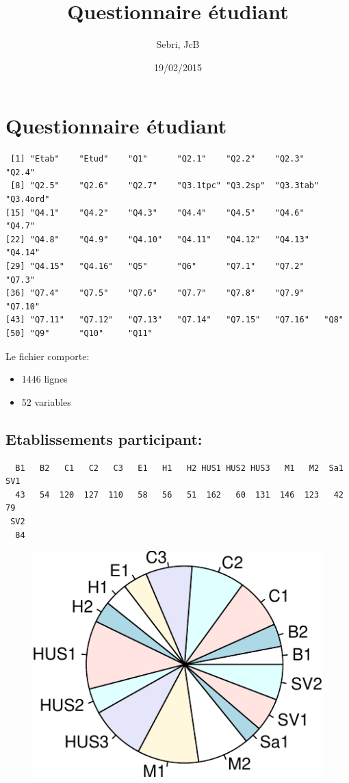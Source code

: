 \documentclass[]{article}
\title{Questionnaire étudiant}
\author{Sebri, JcB}
\date{19/02/2015}
\begin{document}
\maketitle


{
\hypersetup{linkcolor=black}
\setcounter{tocdepth}{2}
\tableofcontents
}
\section{Questionnaire étudiant}\label{questionnaire-etudiant}

\begin{verbatim}
 [1] "Etab"    "Etud"    "Q1"      "Q2.1"    "Q2.2"    "Q2.3"    "Q2.4"   
 [8] "Q2.5"    "Q2.6"    "Q2.7"    "Q3.1tpc" "Q3.2sp"  "Q3.3tab" "Q3.4ord"
[15] "Q4.1"    "Q4.2"    "Q4.3"    "Q4.4"    "Q4.5"    "Q4.6"    "Q4.7"   
[22] "Q4.8"    "Q4.9"    "Q4.10"   "Q4.11"   "Q4.12"   "Q4.13"   "Q4.14"  
[29] "Q4.15"   "Q4.16"   "Q5"      "Q6"      "Q7.1"    "Q7.2"    "Q7.3"   
[36] "Q7.4"    "Q7.5"    "Q7.6"    "Q7.7"    "Q7.8"    "Q7.9"    "Q7.10"  
[43] "Q7.11"   "Q7.12"   "Q7.13"   "Q7.14"   "Q7.15"   "Q7.16"   "Q8"     
[50] "Q9"      "Q10"     "Q11"    
\end{verbatim}

Le fichier comporte:

\begin{itemize}
\itemsep1pt\parskip0pt
\item
  1446 lignes
\item
  52 variables
\end{itemize}

\subsection{Etablissements
participant:}\label{etablissements-participant}

\begin{verbatim}
  B1   B2   C1   C2   C3   E1   H1   H2 HUS1 HUS2 HUS3   M1   M2  Sa1  SV1 
  43   54  120  127  110   58   56   51  162   60  131  146  123   42   79 
 SV2 
  84 
\end{verbatim}

\begin{figure}[htbp]
\centering
\includegraphics{qs_etudiants_files/figure-latex/participants-1.pdf}
\end{figure}
\end{document}
